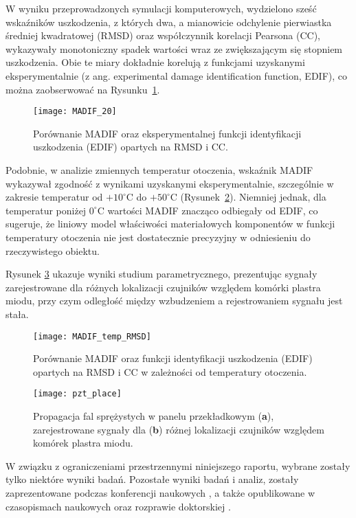 \documentclass[a4paper,11pt]{article}
\begin{document}
W wyniku przeprowadzonych symulacji komputerowych, wydzielono sześć wskaźników uszkodzenia, z których dwa, a mianowicie odchylenie pierwiastka średniej kwadratowej (RMSD) oraz współczynnik korelacji Pearsona (CC), wykazywały monotoniczny spadek wartości wraz ze zwiększającym się stopniem uszkodzenia. Obie te miary dokładnie korelują z funkcjami uzyskanymi eksperymentalnie (z ang. experimental damage identification function, EDIF), co można zaobserwować na Rysunku~\ref{fig:madif}.

\begin{figure}[hb]
	\centering
	\captionsetup{width=.9\textwidth}
	\texttt{[image: MADIF\_20]}
	\caption{Porównanie MADIF oraz eksperymentalnej funkcji identyfikacji uszkodzenia (EDIF) opartych na RMSD i CC.}
	\label{fig:madif}
\end{figure}

Podobnie, w analizie zmiennych temperatur otoczenia, wskaźnik MADIF wykazywał zgodność z wynikami uzyskanymi eksperymentalnie, szczególnie w zakresie temperatur od \(+10^\circ\)C do \(+50^\circ\)C (Rysunek~\ref{fig:madif_temp_RMSD}). Niemniej jednak, dla temperatur poniżej \(0^\circ\)C wartości MADIF znacząco odbiegały od EDIF, co sugeruje, że liniowy model właściwości materiałowych komponentów w funkcji temperatury otoczenia nie jest dostatecznie precyzyjny w odniesieniu do rzeczywistego obiektu.

Rysunek \ref{fig:pzt_place} ukazuje wyniki studium parametrycznego, prezentując sygnały zarejestrowane dla różnych lokalizacji czujników względem komórki plastra miodu, przy czym odległość między wzbudzeniem a rejestrowaniem sygnału jest stała.

\begin{figure}
	\centering
	\captionsetup{width=.9\textwidth}
	\texttt{[image: MADIF\_temp\_RMSD]}
	\caption{Porównanie MADIF oraz funkcji identyfikacji uszkodzenia (EDIF) opartych na RMSD i CC w zależności od temperatury otoczenia.}
	\label{fig:madif_temp_RMSD}
\end{figure}
\begin{figure}
	\centering
	\captionsetup{width=.9\textwidth}
	\texttt{[image: pzt\_place]}
	\caption{Propagacja fal sprężystych w panelu przekładkowym (\textbf{a}), zarejestrowane sygnały dla (\textbf{b}) różnej lokalizacji czujników względem komórek plastra miodu.}
	\label{fig:pzt_place}
\end{figure}
W związku z ograniczeniami przestrzennymi niniejszego raportu, wybrane zostały tylko niektóre wyniki badań.
Pozostałe wyniki badań i analiz, zostały zaprezentowane podczas konferencji naukowych \cite{fiborek2023model, fiborek2023parametric}, a także opublikowane w czasopismach naukowych \cite{balasubramaniam2021damage, balasubramaniam2021ultrasonic, balasbramaniam20021experimental, balasubramaniam2021lamb} oraz rozprawie doktorskiej \cite{fiborek2023modelling}. 
\end{document}
